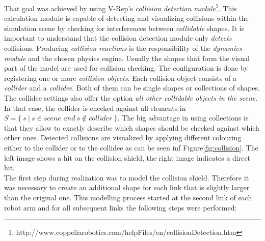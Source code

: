 That goal was achieved by using V-Rep's \emph{collision detection module}\footnote{http://www.coppeliarobotics.com/helpFiles/en/collisionDetection.htm}. This calculation module is capable of detecting and visualizing collisions within the simulation scene by checking for interferences between \emph{collidable} shapes. It is important to understand that the collision detection module only \textit{detects} collisions. Producing \emph{collision reactions} is the responsibility of the \emph{dynamics module} and the chosen physics engine. Usually the shapes that form the visual part of the model are used for collision checking. The configuration is done by registering one or more \emph{collision objects}. Each collision object consists of a \emph{collider} and a \emph{collidee}. Both of them can be single shapes or collections of shapes. The collidee settings also offer the option \emph{all other collidable objects in the scene}. In that case, the collider is checked against all elements in $S=\{~s~|~s\in\textit{scene and}~s\notin\textit{collider}~\}$. The big advantage in using collections is that they allow to exactly describe which shapes should be checked against which other ones. Detected collisions are visualized by applying different colouring either to the collider or to the collidee as can be seen inf Figure\ref{fig:collision}. The left image shows a hit on the collision shield, the right image indicates a direct hit.\\

The first step during realization was to model the collision shield. Therefore it was necessary to create an additional shape for each link that is slightly larger than the original one. This modelling process started at the second link of each robot arm and for all subsequent links the following steps were performed:

